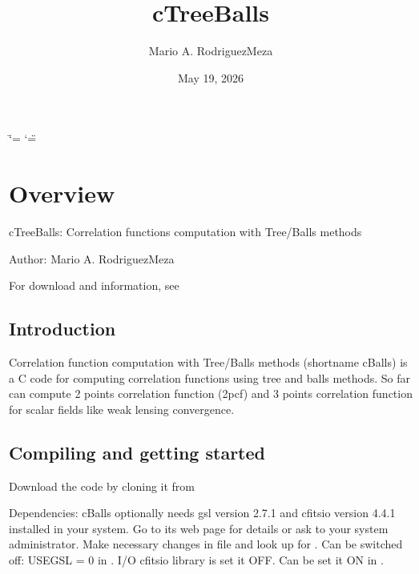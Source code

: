 \documentclass[letterpaper,10pt,english]{sphinxmanual}
\title{cTreeBalls}
\date{May 19, 2026}
\author{Mario A.\@{} Rodriguez\sphinxhyphen{}Meza}
\begin{document}
\ifdefined\shorthandoff
  \ifnum\catcode`\=\string=\active\shorthandoff{=}\fi
  \ifnum\catcode`\"=\active{}\fi
\fi

\pagestyle{empty}
\sphinxmaketitle
\pagestyle{plain}
\sphinxtableofcontents
\pagestyle{normal}
\label{\detokenize{index::doc}}


\sphinxstepscope


\chapter{Overview}
\label{\detokenize{overview:overview}}\label{\detokenize{overview::doc}}
\sphinxAtStartPar
cTreeBalls: Correlation functions computation with Tree/Balls methods

\sphinxAtStartPar
Author: Mario A. Rodriguez\sphinxhyphen{}Meza

\sphinxAtStartPar
For download and information, see 


\section{Introduction}
\label{\detokenize{overview:introduction}}
\sphinxAtStartPar
Correlation function computation with Tree/Balls methods (short\sphinxhyphen{}name cBalls) is a C code for computing correlation functions using tree and balls methods. So far can compute 2 points correlation function (2pcf) and 3 points correlation function for scalar fields like weak lensing convergence.


\section{Compiling and getting started}
\label{\detokenize{overview:compiling-and-getting-started}}
\sphinxAtStartPar
Download the code by cloning it from 

\sphinxAtStartPar
Dependencies: cBalls optionally needs gsl version 2.7.1 and cfitsio version 4.4.1 installed in your system. Go to its web page  for details or ask to your system administrator. Make necessary changes in  file and look up for . Can be switched off: USEGSL = 0 in . I/O cfitsio library is set it OFF. Can be set it ON in .
\end{document}
